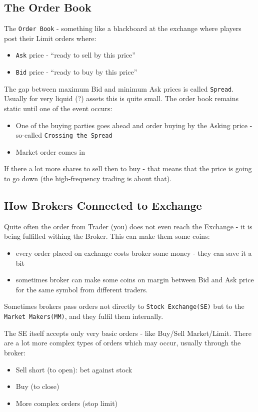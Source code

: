 \documentclass{scrartcl}
\newcommand{\term}[1]{\verb~#1~} %
\begin{document}
\subsection{The Order Book}
\label{sec:OrderBook}
The \term{Order Book} - something like a blackboard at the exchange where
players post their Limit orders where:
\begin{itemize}
\item \term{Ask} price - ``ready to sell by this price''
\item \term{Bid} price - ``ready to buy by this price''
\end{itemize}
The gap between maximum Bid and minimum Ask prices is called \term{Spread}.
Usually for very liquid (?) assets this is quite small. The order book remains
static until one of the event occurs:
\begin{itemize}
\item One of the buying parties goes ahead and order buying by the Asking price
  - so-called \term{Crossing the Spread}
\item Market order comes in
\end{itemize}

If there a lot more shares to sell then to buy - that means that the price is
going to go down (the high-frequency trading is about that).

\subsection{How Brokers Connected to Exchange}
\label{sec:BrokerConnectionToExchange}

Quite often the order from Trader (you) does not even reach the Exchange - it is
being fulfilled withing the Broker. This can make them some coins:
\begin{itemize}
\item every order placed on exchange costs broker some money - they can save it
  a bit
\item sometimes broker can make some coins on margin between Bid and Ask price
  for the same symbol from different traders.
\end{itemize}

Sometimes brokers pass orders not directly to \term{Stock Exchange(SE)} but to
the \term{Market Makers(MM)}, and they fulfil them internally.

The SE itself accepts only very basic orders - like Buy/Sell Market/Limit. There
are a lot more complex types of orders which may occur, usually through the
broker:
\begin{itemize}
\item Sell short (to open): bet against stock
\item Buy (to close)
\item More complex orders (stop limit)
\end{itemize}
\end{document}
